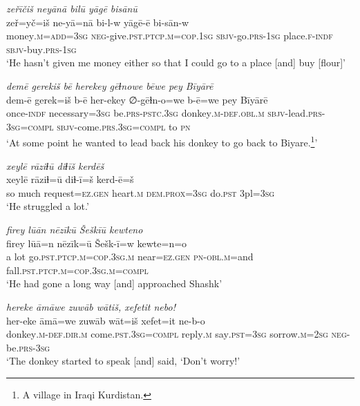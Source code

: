 \ea \label{HB.22}
\textit{zeřīčiš neyānā bilū yāgē bisānū} \\ 
\gll zeř=yč=iš ne-yā=nā bi-l-w yāgē-ē bi-sān-w \\ 
 money\textsc{.m}\textsc{=add}\textsc{=3sg} \textsc{neg-}give\textsc{.pst}\textsc{.ptcp}\textsc{.m}\textsc{=cop}\textsc{.1sg} \textsc{sbjv-}go\textsc{.prs}\textsc{-1sg} place\textsc{\textsc{.f}}\textsc{-indf} \textsc{sbjv-}buy\textsc{.prs}\textsc{-1sg} \\ 
\glt `He hasn’t given me money either so that I could go to a place [and] buy [flour]'
\z 
 
\ea \label{HB.25}
\textit{demē gerekiš bē herekey gēɫnowe bēwe pey Bīyārē} \\ 
\gll dem-ē gerek=iš b-ē her-ekey ∅-gēɫn-o=we b-ē=we pey Bīyārē \\ 
 once\textsc{-indf} necessary\textsc{=3sg} be\textsc{.prs}\textsc{-pstc}\textsc{.3sg} donkey\textsc{.m}\textsc{-def}\textsc{.obl}\textsc{.m} \textsc{sbjv-}lead\textsc{.prs}\textsc{-3sg}\textsc{=\textsc{compl}} \textsc{sbjv-}come\textsc{.prs}\textsc{.3sg}\textsc{=\textsc{compl}} to \textsc{pn} \\ 
\glt `At some point he wanted to lead back his donkey to go back to Biyare.\footnote{A village in Iraqi Kurdistan.}'
\z 
 
\ea \label{HB.28}
\textit{xeylē rāziɫū diɫīš kerdēš} \\ 
\gll xeylē rāziɫ=ū diɫ-ī=š kerd-ē=š \\ 
 so much request\textsc{=ez}\textsc{.gen} heart\textsc{.m} \textsc{dem.prox}\textsc{=3sg} do\textsc{.pst} 3pl\textsc{=3sg} \\ 
\glt `He struggled a lot.'
\z 
 
\ea \label{HB.30}
\textit{firey lūān nēzīkū Šeškīū kewteno} \\ 
\gll firey lūā=n nēzīk=ū Šešk-ī=w kewte=n=o \\ 
 a lot go\textsc{.pst}\textsc{.ptcp}\textsc{.m}\textsc{=cop}\textsc{.3sg}\textsc{.m} near\textsc{=ez}\textsc{.gen} \textsc{pn}\textsc{-obl}\textsc{.m}=and fall\textsc{.pst}\textsc{.ptcp}\textsc{.m}\textsc{=cop}\textsc{.3sg}\textsc{.m}\textsc{=\textsc{compl}} \\ 
\glt `He had gone a long way [and] approached Shashk'
\z 
 
\ea \label{HB.31}
\textit{hereke āmāwe zuwāb wātiš, xefetit nebo!} \\ 
\gll her-eke āmā=we zuwāb wāt=iš xefet=it ne-b-o \\ 
 donkey\textsc{.m}\textsc{-def}\textsc{.dir}\textsc{.m} come\textsc{.pst}\textsc{.3sg}\textsc{=compl} reply\textsc{.m} say\textsc{.pst}\textsc{=3sg} sorrow\textsc{.m}\textsc{=\textsc{2sg}} \textsc{neg-}be\textsc{.prs}\textsc{-3sg} \\ 
\glt `The donkey started to speak [and] said, ‘Don’t worry!'
\z 
 
